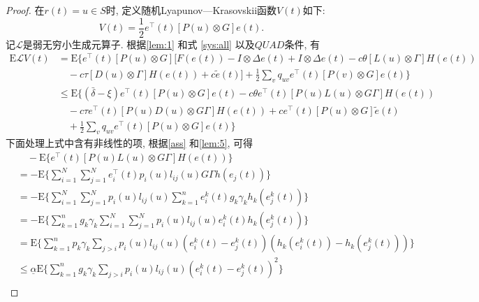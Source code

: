         \begin{proof}
        在$r(t)=u\in S$时, 定义随机Lyapunov—Krasovskii函数$V(t)$如下:
        \begin{equation*}
            V(t)=\frac{1}{2}e^{\top}(t)[P(u)\otimes G]e(t).
        \end{equation*}
        记$\mathcal{L}$是弱无穷小生成元算子. 根据\autoref{lem:1} 和式 \eqref{sys:all} 以及$QUAD$条件, 有
            \begin{align}\label{diff:V}
            \nonumber \mathrm{E}\mathcal{L}V(t)&=\mathrm{E}\bigg\{e^{\top}(t)[P(u)\otimes G]\Big [F(e(t))-I\otimes\Delta e(t)+I\otimes\Delta e(t)-c\theta \left[L(u)\otimes\Gamma\right] H(e(t))\\
            \nonumber &\quad-c\tau[D(u)\otimes\Gamma] H(e(t))+c\tilde{e}(t)\Big]+\frac{1}{2}\sum_{v}q_{uv}e^\top(t)\left[P(v)\otimes G\right]e(t)\bigg\}\\
            \nonumber &\leq \mathrm{E}\bigg\{(\bar{\delta}-\xi)e^\top(t)[P(u)\otimes G]e(t)-c\theta e^{\top}(t)[P(u)L(u)\otimes G\Gamma] H(e(t))\\
            \nonumber &\quad-c\tau e^{\top}(t)[P(u)D(u)\otimes G\Gamma]H(e(t))+ce^{\top}(t)[P(u)\otimes G]\tilde{e}(t)\\
            &\quad+\frac{1}{2}\sum_{v}q_{uv}e^{\top}(t)\left[P(u)\otimes G\right]e(t)\bigg\}
            \end{align}
        下面处理上式中含有非线性的项, 根据\autoref{ass} 和\autoref{lem:5}, 可得
            \begin{align}\label{equ:2}
            \nonumber&\quad-\mathrm{E}\Big\{e^{\top}(t)[P(u)L(u)\otimes G\Gamma]H(e(t))\Big\}\\
            &=-\mathrm{E}\bigg\{\sum^{N}_{i=1}\sum^{N}_{j=1}e^{\top}_{i}(t)p_i(u)l_{ij}(u)G\Gamma h(e_{j}(t))\bigg\}\\
            \nonumber &=-\mathrm{E}\bigg\{\sum^{N}_{i=1}\sum^{N}_{j=1}p_i(u)l_{ij}(u)\sum^{n}_{k=1}e^{k}_{i}(t)g_{k}\gamma_{k}h_{k}(e^{k}_{j}(t))\bigg\}\\
            \nonumber &=-\mathrm{E}\bigg\{\sum^{n}_{k=1}g_{k}\gamma_{k}\sum^{N}_{i=1}\sum^{N}_{j=1}p_i(u)l_{ij}(u)e^{k}_{i}(t)h_{k}(e^{k}_{j}(t))\bigg\}\\
            \nonumber &=\mathrm{E}\bigg\{\sum^{n}_{k=1}p_{k}\gamma_{k}\sum_{j>i}p_i(u)l_{ij}(u)(e^{k}_{i}(t)-e^{k}_{j}(t))(h_{k}(e^{k}_{i}(t))-h_{k}(e^{k}_{j}(t)))\bigg\}\\
            \nonumber &\leq\underline{\alpha}\mathrm{E}\bigg\{\sum^{n}_{k=1}g_{k}\gamma_{k}\sum_{j>i}p_i(u)l_{ij}(u)(e^{k}_{i}(t)-e^{k}_{j}(t))^2\bigg\}\\

\end{align}
\end{proof}
